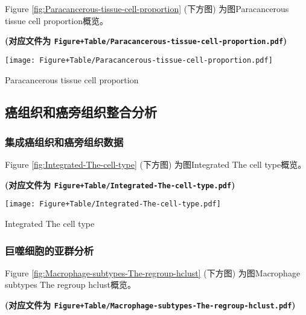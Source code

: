 \documentclass[
]{article}
\begin{document}
Figure \ref{fig:Paracancerous-tissue-cell-proportion} (下方图) 为图Paracancerous tissue cell proportion概览。

\textbf{(对应文件为 \texttt{Figure+Table/Paracancerous-tissue-cell-proportion.pdf})}

\def\@captype{figure}
\begin{center}
\texttt{[image: Figure+Table/Paracancerous-tissue-cell-proportion.pdf]}
\caption{Paracancerous tissue cell proportion}\label{fig:Paracancerous-tissue-cell-proportion}
\end{center}

\hypertarget{ux764cux7ec4ux7ec7ux548cux764cux65c1ux7ec4ux7ec7ux6574ux5408ux5206ux6790}{%
\subsection{癌组织和癌旁组织整合分析}\label{ux764cux7ec4ux7ec7ux548cux764cux65c1ux7ec4ux7ec7ux6574ux5408ux5206ux6790}}

\hypertarget{ux96c6ux6210ux764cux7ec4ux7ec7ux548cux764cux65c1ux7ec4ux7ec7ux6570ux636e}{%
\subsubsection{集成癌组织和癌旁组织数据}\label{ux96c6ux6210ux764cux7ec4ux7ec7ux548cux764cux65c1ux7ec4ux7ec7ux6570ux636e}}

Figure \ref{fig:Integrated-The-cell-type} (下方图) 为图Integrated The cell type概览。

\textbf{(对应文件为 \texttt{Figure+Table/Integrated-The-cell-type.pdf})}

\def\@captype{figure}
\begin{center}
\texttt{[image: Figure+Table/Integrated-The-cell-type.pdf]}
\caption{Integrated The cell type}\label{fig:Integrated-The-cell-type}
\end{center}

\hypertarget{ux5de8ux566cux7ec6ux80deux7684ux4e9aux7fa4ux5206ux6790}{%
\subsubsection{巨噬细胞的亚群分析}\label{ux5de8ux566cux7ec6ux80deux7684ux4e9aux7fa4ux5206ux6790}}

Figure \ref{fig:Macrophage-subtypes-The-regroup-hclust} (下方图) 为图Macrophage subtypes The regroup hclust概览。

\textbf{(对应文件为 \texttt{Figure+Table/Macrophage-subtypes-The-regroup-hclust.pdf})}
\end{document}

